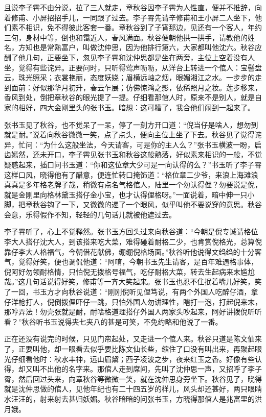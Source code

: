 \documentclass[12pt,UTF8]{ctexbook}
\begin{document}
{{{且说李子霄不由分说，拉了三人就走，章秋谷因李子霄为人性直，便并不推辞，向着修甫、小屏招招手儿，一同跟了过去。李子霄先请辛修甫和王小屏二人坐下，他们素不相识，免不得彼此客套一番。章秋谷到了子宵那边，见还有一个客人，年约三旬，身材中等，倒也和霭近人，春风满面。秋谷便朝他拱一拱手，请教他的姓名，方知也是常熟富户，叫做沈仲思，因为他排行第六，大家都叫他沈六。秋谷应酬了他几句，正要坐下，忽见李子霄和沈仲思都是坐在两旁，主位上空着没有人坐，觉得有些诧异。正要问时，只听得莺声呖呖，从洋台上转进一个倌人：宝髻盘云，珠光照采；衣裳艳丽，态度妖娆；眉横远岫之烟，眼媚湘江之水。一步步的走到面前：好似那华月初升，春云乍展；仿佛惊鸿之影，依稀照月之妆。莲步移来，香风到处，倒把章秋谷的眼光提了一提。仔细看那倌人时，原来不是别人，就是自家的相好，四大金刚里头的张书玉。暗想：这可糟了，我合他们闹到一起来了。

张书玉见了秋谷，也不觉呆了一呆，停了一刻方开口道：“倪当仔是啥人，想勿到就是耐。”说着向秋谷微微一笑，点了点头，便向主位上坐了下去。秋谷见了觉得诧异，忙问：“为什么这般坐法，今天请客，可是你的主人么？”张书玉横波一盼，启齿嫣然，还未开口，李子霄见张书玉和秋谷这般熟落，好似素来相识的一般，不觉疑惑起来，插口问书玉道：“你和这位章大少可是一向认得的么？”书玉听了李子霄这样口风，晓得他有了醋意，便连忙转口掩饰道：“格位章二少爷，来浪上海滩浪真真是多年格老牌子哉，稍微有点名气格倌人，陆里一个勿认得俚？勿要说是倪，就是金刚里向格林黛玉搭仔金小宝，也才认得俚格呀。”一面说着，暗中伸一只小脚，把章秋谷钩了一下，又微微的递了一个眼风，似乎叫他不要说穿的意思。秋谷会意，乐得假作不知，轻轻的几句话儿就被他遮过去。

李子霄听了，心上不觉释然。张书玉方回头过来向秋谷道：“今朝是倪专诚请格位李大人搭仔沈大人，到该搭来吃大菜，难得碰着耐格二少，也肯赏倪格光，总算倪靠仔李大人格福气，今朝借花献佛，绷绷倪格场面。”秋谷听他说得文绉绉的十分客气，觉得好笑，便也调侃他道：“阿唷，今朝书玉先生请客，是百年难遇格事体，倪阿好勿领耐格情，只怕倪无拨格号福气，吃仔耐格大菜，转去生起病来末尴尬哉。”这几句话说得好笑，修甫等一齐大笑起来。张书玉也忍不住抿着嘴儿好笑，笑了一回，书玉方才向秋谷说道：“刚刚倪听见俚笃说，有两个外国人吃醉仔酒，拿仔洋枪打人，倪倒拨俚吓仔一跳，只怕外国人勿讲理性，瞎打一泡，打起倪来末，那哼弄法！勿壳张就是耐，耐啥格道理搭仔外国人两家头吵起来，阿好讲拨倪听听看？”秋谷听书玉说得夹七夹八的甚是可笑，不免约略和他说了一番。

正在还没有说完的时候，只见门帘起处，又走进一个倌人来。秋谷只道是陈文仙来了，正要叫他，却一眼看去似乎要比陈文仙长些，缩住了口没有叫出来，再聚起眼光仔细看他时：秋水丰神，远山眉黛；西子凌波之步，夜来红玉之香。好像有些认得，却又叫不出他的名字来。那倌人走到席间，先叫了沈仲思一声，又招呼了李子霄，然后回过头来，向章秋谷等微微一笑，就在沈仲思身旁坐下。秋谷见了，晓得就是沈仲思做的倌人，见他年纪也有二十四五岁的样儿，风头却还甚好，两只眼睛水汪汪的，射来射去甚归妖媚。秋谷暗暗的问张书玉，方晓得那倌人是兆富里的洪月娥。

}}}
\end{document}
